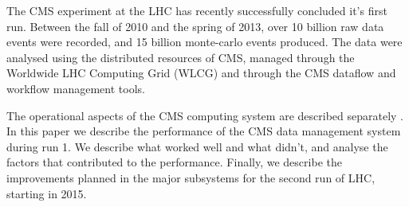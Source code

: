 The CMS \cite{CMS} experiment at the LHC has recently successfully concluded it's first run. 
Between the fall of 2010 and the spring of 2013, over 10 billion raw data events were recorded, 
and 15 billion monte-carlo events produced. The data were analysed using the distributed resources 
of CMS, managed through the Worldwide LHC Computing Grid (WLCG) \cite{WLCG} and through the CMS 
dataflow and workflow management tools.

The operational aspects of the CMS computing system are described separately \cite{OliOps}. In 
this paper we describe the performance of the CMS data management system during run 1. We describe 
what worked well and what didn't, and analyse the factors that contributed to the performance. 
Finally, we describe the improvements planned in the major subsystems for the second run of LHC, 
starting in 2015.
